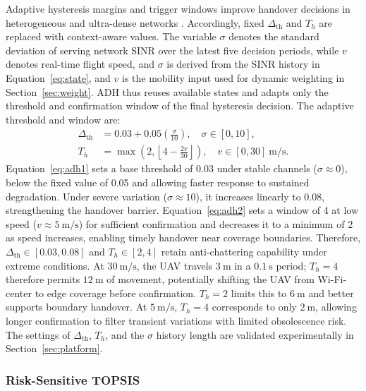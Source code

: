 \documentclass[final,3p,times,twocolumn]{elsarticle}
\begin{document}
Adaptive hysteresis margins and trigger windows improve handover decisions in heterogeneous and ultra-dense networks \cite{ref28,ref29,ref30,ref31}. Accordingly, fixed $\Delta_{\mathrm{th}}$ and $T_h$ are replaced with context-aware values. The variable $\sigma$ denotes the standard deviation of serving network SINR over the latest five decision periods, while $v$ denotes real-time flight speed, and $\sigma$ is derived from the SINR history in Equation~\eqref{eq:state}, and $v$ is the mobility input used for dynamic weighting in Section~\ref{sec:weight}. ADH thus reuses available states and adapts only the threshold and confirmation window of the final hysteresis decision. The adaptive threshold and window are:
\begin{align}
\Delta_{\mathrm{th}} &= 0.03+0.05\left(\frac{\sigma}{10}\right),\quad \sigma\in[0,10], \label{eq:adh1}\\
T_h &= \max\left(2,\left\lfloor4-\frac{2v}{30}\right\rfloor\right),\quad v\in[0,30]~\mathrm{m/s}. \label{eq:adh2}
\end{align}
Equation~\eqref{eq:adh1} sets a base threshold of 0.03 under stable channels ($\sigma\approx0$), below the fixed value of 0.05 and allowing faster response to sustained degradation. Under severe variation ($\sigma\approx10$), it increases linearly to 0.08, strengthening the handover barrier. Equation~\eqref{eq:adh2} sets a window of 4 at low speed ($v\approx5~\mathrm{m/s}$) for sufficient confirmation and decreases it to a minimum of 2 as speed increases, enabling timely handover near coverage boundaries. Therefore, $\Delta_{\mathrm{th}}\in[0.03,0.08]$ and $T_h\in[2,4]$ retain anti-chattering capability under extreme conditions. At $30~\mathrm{m/s}$, the UAV travels $3~\mathrm{m}$ in a $0.1~\mathrm{s}$ period; $T_h=4$ therefore permits $12~\mathrm{m}$ of movement, potentially shifting the UAV from Wi-Fi-center to edge coverage before confirmation. $T_h=2$ limits this to $6~\mathrm{m}$ and better supports boundary handover. At $5~\mathrm{m/s}$, $T_h=4$ corresponds to only $2~\mathrm{m}$, allowing longer confirmation to filter transient variations with limited obsolescence risk. The settings of $\Delta_{\mathrm{th}}$, $T_h$, and the $\sigma$ history length are validated experimentally in Section~\ref{sec:platform}.

\subsubsection{Risk-Sensitive TOPSIS}\label{sec:rstopsis}
\end{document}
